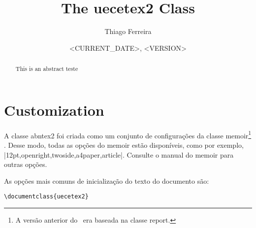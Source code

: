 \documentclass[letterpaper]{ltxdoc}
\title{The \textsf{uecetex2} Class}
\author{Thiago Ferreira}
\date{<CURRENT_DATE>, <VERSION>}
\begin{document}
\maketitle

\begin{abstract}
    This is an abstract teste
\end{abstract}

\tableofcontents

\section{Customization}
\label{sec:customizaton}

\DescribeMacro{\documentclass}
A classe \textsf{abntex2} foi criada como um conjunto de configurações da classe
\textsf{memoir}\footnote{A versão anterior do ~era baseada na classe
\textsf{report}.} \cite{memoir}. Desse modo, todas as opções do \textsf{memoir}
estão disponíveis, como por exemplo, |12pt,openright,twoside,a4paper,article|.
Consulte o manual do \textsf{memoir} para outras opções.

As opções mais comuns de inicialização do texto do documento são:

\begin{verbatim}
\documentclass{uecetex2}
\end{verbatim}
\end{document}
